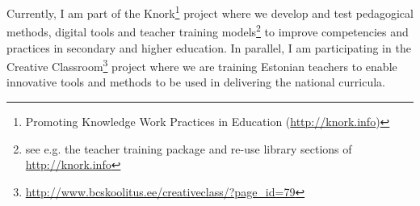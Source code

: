 Currently, I am part of the Knork\footnote{Promoting Knowledge Work Practices in Education (\url{http://knork.info})} project where we develop and test pedagogical methods, digital tools and teacher training models\footnote{see e.g. the teacher training package and re-use library sections of \url{http://knork.info}} to improve competencies and practices in secondary and higher education. 
In parallel, I am participating in the Creative Classroom\footnote{\url{http://www.bcskoolitus.ee/creativeclass/?page_id=79}} project where we are training Estonian teachers  to enable innovative tools and methods to be used in delivering the national curricula.

  
  
  
  